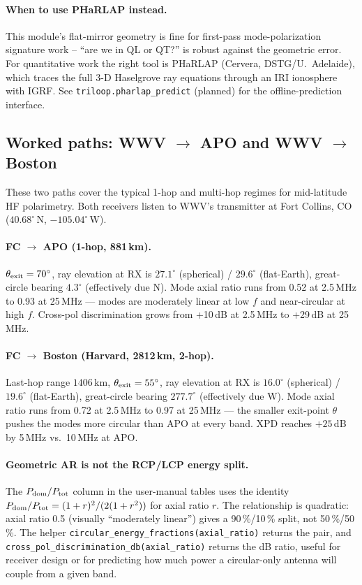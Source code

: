\documentclass[11pt]{article}
\begin{document}
\paragraph{When to use PHaRLAP instead.}  This module's flat-mirror
geometry is fine for first-pass mode-polarization signature work --
``are we in QL or QT?'' is robust against the geometric error.  For
quantitative work the right tool is PHaRLAP (Cervera, DSTG/U.\
Adelaide), which traces the full 3-D Haselgrove ray equations through
an IRI ionosphere with IGRF.  See \texttt{triloop.pharlap\_predict}
(planned) for the offline-prediction interface.

\subsection{Worked paths: WWV $\to$ APO and WWV $\to$ Boston}
\label{sec:worked-paths-ref}

These two paths cover the typical 1-hop and multi-hop regimes for
mid-latitude HF polarimetry.  Both receivers listen to WWV's
transmitter at Fort Collins, CO ($40.68^\circ$\,N, $-105.04^\circ$\,W).

\paragraph{FC $\to$ APO  (1-hop, 881\,km).}
$\theta_{\rm exit} = 70^\circ$, ray elevation at RX is $27.1^\circ$
(spherical) / $29.6^\circ$ (flat-Earth), great-circle bearing
$4.3^\circ$ (effectively due N).  Mode axial ratio runs from 0.52 at
2.5\,MHz to 0.93 at 25\,MHz --- modes are moderately linear at low
$f$ and near-circular at high $f$.  Cross-pol discrimination grows
from +10\,dB at 2.5\,MHz to +29\,dB at 25\,MHz.

\paragraph{FC $\to$ Boston (Harvard, 2812\,km, 2-hop).}
Last-hop range $1406$\,km, $\theta_{\rm exit} = 55^\circ$, ray
elevation at RX is $16.0^\circ$ (spherical) / $19.6^\circ$
(flat-Earth), great-circle bearing $277.7^\circ$ (effectively due W).
Mode axial ratio runs from 0.72 at 2.5\,MHz to 0.97 at 25\,MHz ---
the smaller exit-point $\theta$ pushes the modes more circular than
APO at every band.  XPD reaches $+25$\,dB by 5\,MHz vs.\ 10\,MHz at APO.

\paragraph{Geometric AR is not the RCP/LCP energy split.}  The
$P_{\rm dom}/P_{\rm tot}$ column in the user-manual tables uses the
identity $P_{\rm dom}/P_{\rm tot} = (1+r)^2/(2(1+r^2))$ for axial
ratio $r$.  The relationship is quadratic:  axial ratio 0.5 (visually
``moderately linear'') gives a 90\,\%/10\,\% split, not 50\,\%/50\,\%.
The helper \texttt{circular\_energy\_fractions(axial\_ratio)} returns
the pair, and \texttt{cross\_pol\_discrimination\_db(axial\_ratio)}
returns the dB ratio, useful for receiver design or for predicting
how much power a circular-only antenna will couple from a given
band.
\end{document}

